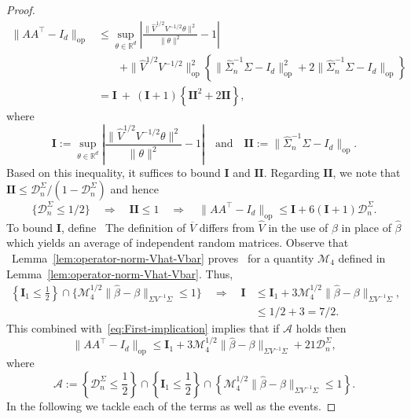 \documentclass{article}
\begin{document}
\begin{appendices}
\begin{proof}
\begin{equation}
\begin{split}
\|AA^{\top} - I_d\|_{\mathrm{op}} &\le \sup_{\theta\in\mathbb{R}^d}\left|\frac{\|\widehat{V}^{1/2}V^{-1/2}\theta\|^2}{\|\theta\|^2} - 1\right|\\ &\qquad+ \|\widehat{V}^{1/2}V^{-1/2}\|_{\mathrm{op}}^2\left\{\|\widehat{\Sigma}_n^{-1}\Sigma - I_d\|_{\mathrm{op}}^2 + 2\|\widehat{\Sigma}_n^{-1}\Sigma - I_d\|_{\mathrm{op}}\right\}\\ &= \mathbf{I} ~+~ (\mathbf{I} + 1)\left\{\mathbf{II}^2 + 2\mathbf{II}\right\},
\end{split}
\end{equation}
where
\begin{equation}\label{eq:decomposition-sandwich-error}
\mathbf{I} := \sup_{\theta\in\mathbb{R}^d}\left|\frac{\|\widehat{V}^{1/2}V^{-1/2}\theta\|^2}{\|\theta\|^2} - 1\right|\quad\mbox{and}\quad \mathbf{II} := \|\widehat{\Sigma}_n^{-1}\Sigma - I_d\|_{\mathrm{op}}.
\end{equation}
Based on this inequality, it suffices to bound $\mathbf{I}$ and $\mathbf{II}$.
Regarding $\mathbf{II}$, we note that $\mathbf{II} \le \mathcal{D}_n^{\Sigma}/(1 - \mathcal{D}_n^{\Sigma})$ and hence
\begin{equation}\label{eq:First-implication}
\{\mathcal{D}_n^{\Sigma} \le 1/2\}\quad\Rightarrow\quad \mathbf{II}\le1\quad\Rightarrow\quad \|AA^{\top} - I_d\|_{\mathrm{op}} \le \mathbf{I} + 6(\mathbf{I} + 1)\mathcal{D}_n^{\Sigma}.
\end{equation} To bound $\mathbf{I}$, define
\ The definition of $\overline{V}$ differs from $\widehat{V}$ in the use of $\beta$ in place of $\widehat{\beta}$ which yields an average of independent random matrices. Observe that
\ Lemma~\ref{lem:operator-norm-Vhat-Vbar} proves
\ for a quantity $\mathcal{M}_4$ defined in Lemma~\ref{lem:operator-norm-Vhat-Vbar}. Thus,
\begin{equation}\label{eq:Second-implication}
\begin{split}
\left\{\mathbf{I}_1 \le \frac{1}{2}\right\}\cap\{\mathcal{M}_4^{1/2}\|\widehat{\beta} - \beta\|_{\Sigma V^{-1}\Sigma} \le 1\}\quad\Rightarrow\quad\mathbf{I} &\le \mathbf{I}_1 + 3\mathcal{M}_4^{1/2}\|\widehat{\beta} - \beta\|_{\Sigma V^{-1}\Sigma},\\ &\le 1/2 + 3 = 7/2.
\end{split}
\end{equation}
This combined with~\eqref{eq:First-implication} implies that if $\mathcal{A}$ holds then
\begin{equation}\label{eq:main-decomposition-sandwich}
\|AA^{\top} - I_d\|_{\mathrm{op}} \le \mathbf{I}_1 + 3\mathcal{M}_4^{1/2}\|\widehat{\beta} - \beta\|_{\Sigma V^{-1}\Sigma} + 21\mathcal{D}_n^{\Sigma},
\end{equation}
where
\begin{equation}\label{eq:crucial-event-sandwich}
\mathcal{A} := \left\{\mathcal{D}_n^{\Sigma} \le \frac{1}{2}\right\}\cap\left\{\mathbf{I}_1 \le \frac{1}{2}\right\}\cap\left\{\mathcal{M}_4^{1/2}\|\widehat{\beta} - \beta\|_{\Sigma V^{-1}\Sigma} \le 1\right\}.
\end{equation}
In the following we tackle each of the terms as well as the events.

\end{proof}
\end{appendices}
\end{document}
